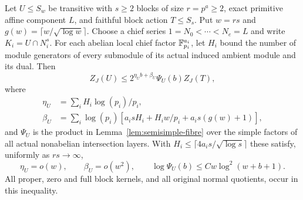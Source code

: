 \begin{theorem}\label{thm:affine-chief}
Let $U\leq S_w$ be transitive with $s\geq2$ blocks of size
$r=p^a\geq2$, exact primitive affine component $L$, and faithful
block action $T\leq S_s$. Put $w=rs$ and
$g(w)=\lceil w/\sqrt{\log w}\rceil$. Choose a chief series
$1=N_0<\cdots<N_e=L$ and write $K_i=U\cap N_i^s$.
For each abelian local chief factor $\mathbb F_{p_i}^{a_i}$, let $H_i$
bound the number of module generators of every submodule of its
actual induced ambient module and its dual. Then
\begin{equation}\label{eq:affine-chief-fibre}
 Z_J(U)\leq2^{\eta_Ub+\beta_U}\Psi_U(b)Z_J(T),
\end{equation}
where
\begin{align*}
 \eta_U&=\sum_iH_i\log(p_i)/p_i,\\
 \beta_U&=\sum_i\log(p_i)
    [a_isH_i+H_iw/p_i+a_is(g(w)+1)],
\end{align*}
and $\Psi_U$ is the product in Lemma~\ref{lem:semisimple-fibre}
over the simple factors of all actual nonabelian intersection layers.
With $H_i\leq\lceil4a_is/\sqrt{\log s}\rceil$ these satisfy,
uniformly as $rs\to\infty$,
\[
 \eta_U=o(w),\qquad \beta_U=o(w^2),\qquad
 \log\Psi_U(b)\leq Cw\log^2(w+b+1).
\]
All proper, zero and full block kernels, and all original normal
quotients, occur in this inequality.
\end{theorem}
